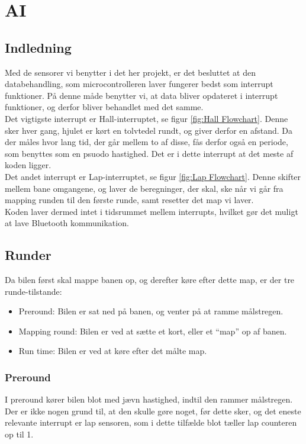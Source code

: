 \section{AI}


\subsection{Indledning}
Med de sensorer vi benytter i det her projekt, er det besluttet at den databehandling, som microcontrolleren laver fungerer bedst som interrupt funktioner. På denne måde benytter vi, at data bliver opdateret i interrupt funktioner, og derfor bliver behandlet med det samme.
\\

Det vigtigste interrupt er Hall-interruptet, se figur \ref{fig:Hall Flowchart}. Denne sker hver gang, hjulet er kørt en tolvtedel rundt, og giver derfor en afstand. Da der måles hvor lang tid, der går mellem to af disse, fås derfor også en periode, som benyttes som en psuodo hastighed. Det er i dette interrupt at det meste af koden ligger.
\\

Det andet interrupt er Lap-interruptet, se figur \ref{fig:Lap Flowchart}. Denne skifter mellem bane omgangene, og laver de beregninger, der skal, ske når vi går fra mapping runden til den første runde, samt resetter det map vi laver.
\\

Koden laver dermed intet  i tidsrummet mellem interrupts, hvilket gør det muligt at lave Bluetooth kommunikation.

\subsection{Runder}

Da bilen først skal mappe banen op, og derefter køre efter dette map, er der tre runde-tilstande:

\begin{itemize}
\item Preround: Bilen er sat ned på banen, og venter på at ramme målstregen.
\item Mapping round: Bilen er ved at sætte et kort, eller et ``map'' op af banen.
\item Run time: Bilen er ved at køre efter det målte map.
\end{itemize}

\subsubsection{Preround}
I preround kører bilen blot med jævn hastighed, indtil den rammer målstregen. Der er ikke nogen grund til, at den skulle gøre noget, før dette sker, og det eneste relevante interrupt er lap sensoren, som i dette tilfælde blot tæller lap counteren op til 1.

